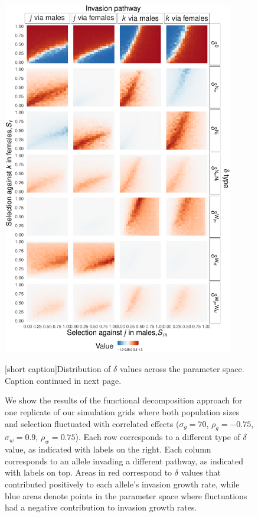 \documentclass[12pt]{article}
\begin{document}

\begin{figure}[H]
  \centerline{\includegraphics[width=0.9\textwidth]{param_space.pdf}}
    \label{fig:space}
    [short caption]{Distribution of $\delta$ values across the parameter space. Caption continued in next page.}
\end{figure}

\addtocounter{figure}{-1}
\begin{figure} [H]
  \caption{ We show the results of the functional decomposition approach for one replicate of our simulation grids where  both population sizes and selection fluctuated with correlated effects  ($\sigma_{g}=70$, $\rho_{g}=-0.75$, $\sigma_{w}=0.9$, $\rho_{w}=0.75$). Each row corresponds to a different type of $\delta$ value, as indicated with labels on the right. Each column corresponds to an allele invading a different pathway, as indicated with labels on top. Areas in red correspond to $\delta$ values that contributed positively to each allele's invasion growth rate, while blue areas denote points in the parameter space where fluctuations had a negative contribution to invasion growth rates.  }%
    \label{fig:space}
\end{figure}
\end{document}
